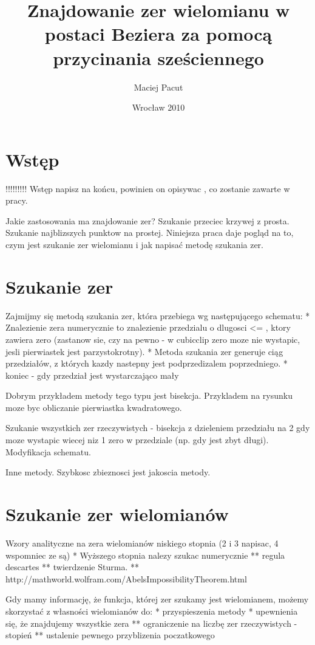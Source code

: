 \documentclass[11pt,a4paper,oneside]{report}
\title{Znajdowanie zer wielomianu w postaci Beziera za pomocą przycinania sześciennego}
\author{Maciej Pacut}
\date{Wrocław 2010}
\begin{document}
\maketitle
\newpage

\section{Wstęp}

!!!!!!!!! Wstęp napisz na końcu, powinien on opisywac , co zostanie zawarte w pracy.

Jakie zastosowania ma znajdowanie zer? Szukanie przeciec krzywej z prosta. Szukanie najblizszych punktow na prostej.
Niniejsza praca daje pogląd na to, czym jest szukanie zer wielomianu i jak napisać metodę szukania zer.

\section{Szukanie zer}

Zajmijmy się metodą szukania zer, która przebiega wg następującego schematu:
* Znalezienie zera numerycznie to znalezienie przedzialu o dlugosci <= \eps, ktory zawiera zero (zastanow sie, czy na pewno - w cubicclip zero moze nie wystapic, jesli pierwiastek jest parzystokrotny).
* Metoda szukania zer generuje ciąg przedziałów, z których kazdy nastepny jest podprzedizalem poprzedniego.
* koniec - gdy przedział jest wystarczająco mały

Dobrym przykładem metody tego typu jest bisekcja. Przykladem na rysunku moze byc obliczanie pierwiastka kwadratowego.

Szukanie wszystkich zer rzeczywistych - bisekcja z dzieleniem przedziału na 2 gdy moze wystapic wiecej niz 1 zero w przedziale (np. gdy jest zbyt długi). Modyfikacja schematu.

Inne metody. Szybkosc zbieznosci jest jakoscia metody. 

\section{Szukanie zer wielomianów}

Wzory analityczne na zera wielomianów niskiego stopnia (2 i 3 napisac, 4 wspomniec ze są)
* Wyższego stopnia nalezy szukac numerycznie
** regula descartes
** twierdzenie Sturma.
** http://mathworld.wolfram.com/AbelsImpossibilityTheorem.html


Gdy mamy informację, że funkcja, której zer szukamy jest wielomianem, możemy skorzystać z własności wielomianów do:
* przyspieszenia metody
* upewnienia się, że znajdujemy wszystkie zera
** ograniczenie na liczbę zer rzeczywistych - stopień
** ustalenie pewnego przyblizenia poczatkowego
\end{document}
